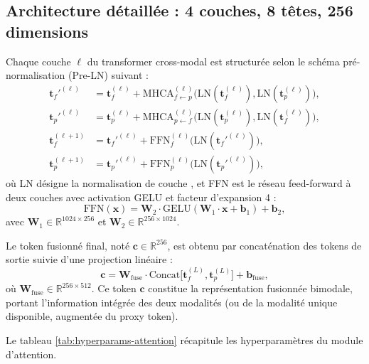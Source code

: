 \documentclass[12pt,a4paper]{report}
\begin{document}
\subsection{Architecture d\'{e}taill\'{e}e : 4 couches, 8 t\^{e}tes, 256 dimensions}

Chaque couche $\ell$ du transformer cross-modal est structur\'{e}e selon le sch\'{e}ma pr\'{e}-normalisation (Pre-LN) suivant :
\begin{align}
\mathbf{t}_f'^{(\ell)} &= \mathbf{t}_f^{(\ell)} + \text{MHCA}_{f \leftarrow p}^{(\ell)}\bigl(\text{LN}(\mathbf{t}_f^{(\ell)}), \text{LN}(\mathbf{t}_p^{(\ell)})\bigr), \\
\mathbf{t}_p'^{(\ell)} &= \mathbf{t}_p^{(\ell)} + \text{MHCA}_{p \leftarrow f}^{(\ell)}\bigl(\text{LN}(\mathbf{t}_p^{(\ell)}), \text{LN}(\mathbf{t}_f^{(\ell)})\bigr), \\
\mathbf{t}_f^{(\ell+1)} &= \mathbf{t}_f'^{(\ell)} + \text{FFN}_f^{(\ell)}\bigl(\text{LN}(\mathbf{t}_f'^{(\ell)})\bigr), \\
\mathbf{t}_p^{(\ell+1)} &= \mathbf{t}_p'^{(\ell)} + \text{FFN}_p^{(\ell)}\bigl(\text{LN}(\mathbf{t}_p'^{(\ell)})\bigr),
\end{align}
o\`{u} LN d\'{e}signe la normalisation de couche \cite{ba2016layer}, et FFN est le r\'{e}seau feed-forward \`{a} deux couches avec activation GELU et facteur d'expansion 4 :
\begin{equation}
\text{FFN}(\mathbf{x}) = \mathbf{W}_2 \cdot \text{GELU}(\mathbf{W}_1 \cdot \mathbf{x} + \mathbf{b}_1) + \mathbf{b}_2,
\end{equation}
avec $\mathbf{W}_1 \in \mathbb{R}^{1024 \times 256}$ et $\mathbf{W}_2 \in \mathbb{R}^{256 \times 1024}$.

Le token fusionn\'{e} final, not\'{e} $\mathbf{c} \in \mathbb{R}^{256}$, est obtenu par concat\'{e}nation des tokens de sortie suivie d'une projection lin\'{e}aire :
\begin{equation}
\label{eq:token-fusionne}
\mathbf{c} = \mathbf{W}_{\text{fuse}} \cdot \text{Concat}\bigl[\mathbf{t}_f^{(L)}, \mathbf{t}_p^{(L)}\bigr] + \mathbf{b}_{\text{fuse}},
\end{equation}
o\`{u} $\mathbf{W}_{\text{fuse}} \in \mathbb{R}^{256 \times 512}$. Ce token $\mathbf{c}$ constitue la repr\'{e}sentation fusionn\'{e}e bimodale, portant l'information int\'{e}gr\'{e}e des deux modalit\'{e}s (ou de la modalit\'{e} unique disponible, augment\'{e}e du proxy token).

Le tableau \ref{tab:hyperparams-attention} r\'{e}capitule les hyperparam\`{e}tres du module d'attention.
\end{document}
